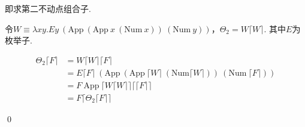 \newcommand{\app}{\mathrm{App}}
\newcommand{\num}{\mathrm{Num}}

\begin{pf} \rm 即求第二不动点组合子.

    令$W\equiv \lambda xy. Ey\ (\app\ (\app\ x\ (\num\ x)) \ (\num\ y))$，$\Theta_2 = W\lceil W \rceil$. 其中$E$为枚举子.

$$
\begin{aligned}
\Theta_2\lceil F\rceil 
&= W  \lceil W\rceil \lceil F\rceil\\
&= E \lceil F\rceil\ (\app\ (\app\ \lceil W\rceil\ (\num \lceil W\rceil))\ (\num\ \lceil F\rceil))\\
&= F\ \app\ \lceil W \lceil W\rceil\rceil \lceil \lceil F\rceil\rceil\\
&= F \lceil \Theta_2 \lceil F\rceil\rceil
\end{aligned}    
$$
   
   \qed
\end{pf}